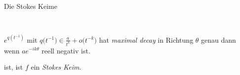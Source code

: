 \begin{frame}{Die Stokes Keime}
\begin{defn}
\begin{itemize}
\begin{enumerate}
{\begin{minipage}{\textwidth}
\begin{flushright}
              \begin{minipage}{.6\textwidth}
                ~
                \vspace{-2em}
                \begin{defn}
                  $e^{q(t^{-1})}$ mit
                  $q\bigl(t^{-1}\bigr)\in\frac{a}{t^{k}}+o\bigl(t^{-k}\bigr)$
                  hat \emph{maximal decay} in Richtung
                    \boldmath$\theta$ genau dann wenn $ae^{-ik\theta}$ reell
                  negativ ist.
                \end{defn}
              \end{minipage}
            \end{flushright}
          \end{minipage}
        }
      \end{enumerate}
      ist, ist $f$ ein \emph{Stokes Keim}.
    \end{itemize}
  \end{defn}
\end{frame}

